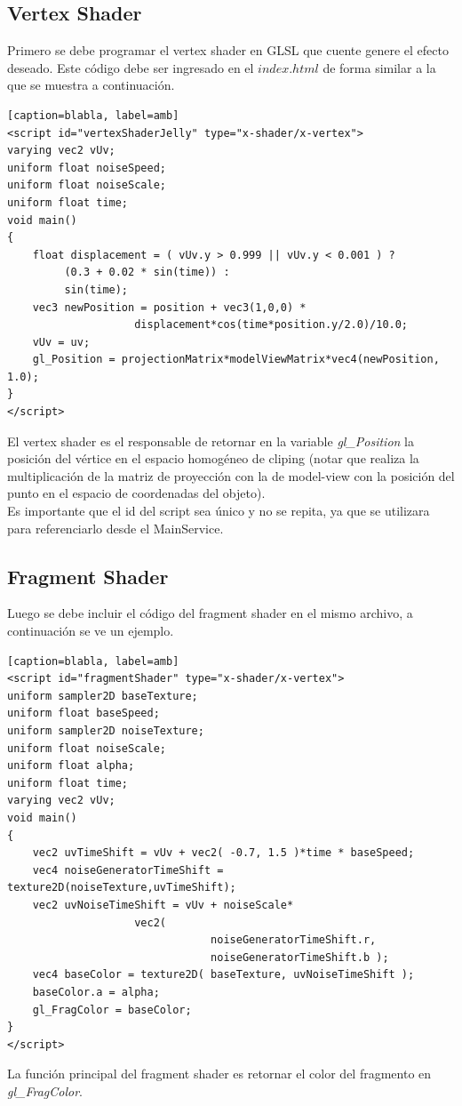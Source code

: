 \documentclass[12pt]{article}
\begin{document}
\subsection{Vertex Shader}
Primero se debe programar el vertex shader en GLSL que cuente genere el efecto deseado. Este código debe ser ingresado en el $index.html$ de forma similar a la que se muestra a continuación.
\begin{lstlisting}[frame=single][caption=blabla, label=amb]
<script id="vertexShaderJelly" type="x-shader/x-vertex">
varying vec2 vUv;
uniform float noiseSpeed;
uniform float noiseScale;
uniform float time;
void main() 
{ 
	float displacement = ( vUv.y > 0.999 || vUv.y < 0.001 ) ? 
		 (0.3 + 0.02 * sin(time)) :  
		 sin(time);
    vec3 newPosition = position + vec3(1,0,0) * 
    				displacement*cos(time*position.y/2.0)/10.0;
    vUv = uv;
    gl_Position = projectionMatrix*modelViewMatrix*vec4(newPosition, 1.0);
}
</script>
\end{lstlisting}
El vertex shader es el responsable de retornar en la variable \textit{gl\_Position} la posición del vértice en el espacio homogéneo de cliping (notar que realiza la multiplicación de la matriz de proyección con la de model-view con la posición del punto en el espacio de coordenadas del objeto).
\\Es importante que el id del script sea único y no se repita, ya que se utilizara para referenciarlo desde el MainService.
\clearpage
\subsection{Fragment Shader}
Luego se debe incluir el código del fragment shader en el mismo archivo, a continuación se ve un ejemplo.
\begin{lstlisting}[frame=single][caption=blabla, label=amb]
<script id="fragmentShader" type="x-shader/x-vertex"> 
uniform sampler2D baseTexture;
uniform float baseSpeed;
uniform sampler2D noiseTexture;
uniform float noiseScale;
uniform float alpha;
uniform float time;
varying vec2 vUv;
void main() 
{
	vec2 uvTimeShift = vUv + vec2( -0.7, 1.5 )*time * baseSpeed;	
	vec4 noiseGeneratorTimeShift = texture2D(noiseTexture,uvTimeShift);
	vec2 uvNoiseTimeShift = vUv + noiseScale*
    				vec2(
                    			noiseGeneratorTimeShift.r, 
                    			noiseGeneratorTimeShift.b );
	vec4 baseColor = texture2D( baseTexture, uvNoiseTimeShift );
	baseColor.a = alpha;
	gl_FragColor = baseColor;
}  
</script>
\end{lstlisting}
La función principal del fragment shader es retornar el color del fragmento en \textit{gl\_FragColor}.
\end{document}
